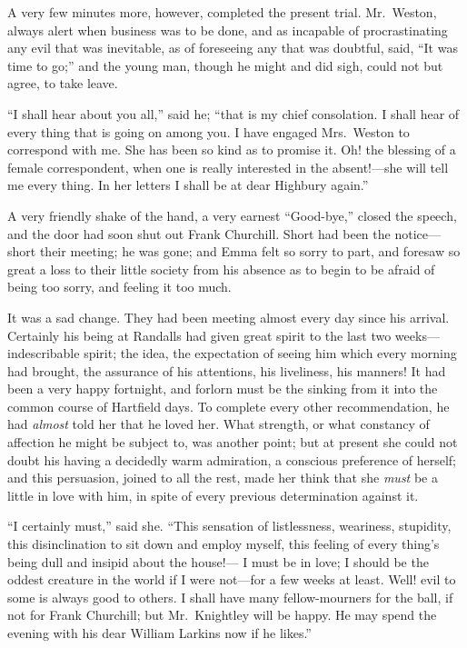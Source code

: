 A very few minutes more, however, completed the present trial.
Mr.\ Weston, always alert when business was to be done, and as
incapable of procrastinating any evil that was inevitable,
as of foreseeing any that was doubtful, said, ``It was time to go;''
and the young man, though he might and did sigh, could not but agree,
to take leave.

``I shall hear about you all,'' said he; ``that is my chief consolation.
I shall hear of every thing that is going on among you.  I have
engaged Mrs.\ Weston to correspond with me.  She has been so kind as
to promise it.  Oh! the blessing of a female correspondent, when one
is really interested in the absent!---she will tell me every thing.
In her letters I shall be at dear Highbury again.''

A very friendly shake of the hand, a very earnest ``Good-bye,''
closed the speech, and the door had soon shut out Frank Churchill.
Short had been the notice---short their meeting; he was gone; and Emma
felt so sorry to part, and foresaw so great a loss to their little
society from his absence as to begin to be afraid of being too sorry,
and feeling it too much.

It was a sad change.  They had been meeting almost every day
since his arrival.  Certainly his being at Randalls had given
great spirit to the last two weeks---indescribable spirit; the idea,
the expectation of seeing him which every morning had brought,
the assurance of his attentions, his liveliness, his manners!
It had been a very happy fortnight, and forlorn must be the sinking
from it into the common course of Hartfield days.  To complete every
other recommendation, he had \emph{almost} told her that he loved her.
What strength, or what constancy of affection he might be subject to,
was another point; but at present she could not doubt his having
a decidedly warm admiration, a conscious preference of herself;
and this persuasion, joined to all the rest, made her think that
she \emph{must} be a little in love with him, in spite of every previous
determination against it.

``I certainly must,'' said she.  ``This sensation of listlessness,
weariness, stupidity, this disinclination to sit down and employ myself,
this feeling of every thing's being dull and insipid about the house!---%
I must be in love; I should be the oddest creature in the world if I
were not---for a few weeks at least.  Well! evil to some is always
good to others.  I shall have many fellow-mourners for the ball,
if not for Frank Churchill; but Mr.\ Knightley will be happy.
He may spend the evening with his dear William Larkins now if he likes.''

